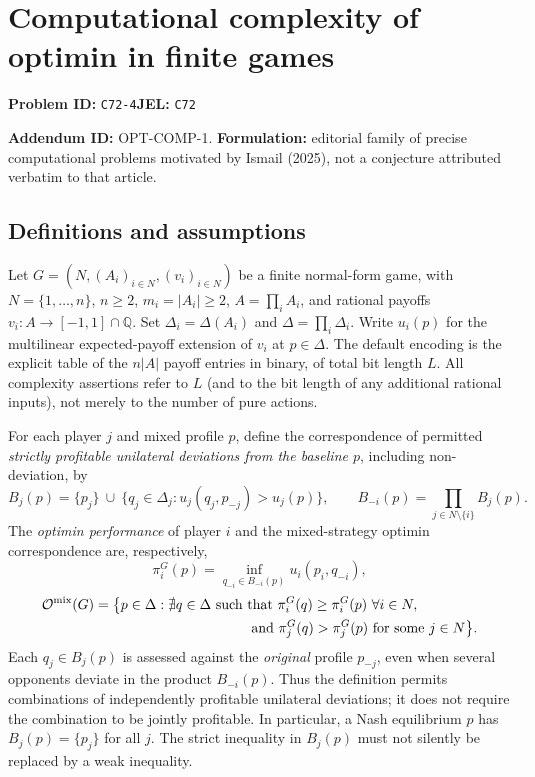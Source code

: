 \documentclass[11pt,a4paper]{article}
\begin{document}
\section*{Computational complexity of optimin in finite games}
\textbf{Problem ID:} \texttt{C72-4}\quad \textbf{JEL:} \texttt{C72}\par
\label{problem:OP-0589}
\noindent\textbf{Addendum ID:} OPT-COMP-1. \textbf{Formulation:} editorial family of precise computational problems motivated by Ismail (2025), not a conjecture attributed verbatim to that article.

\subsection*{Definitions and assumptions}

Let $G=(N,(A_i)_{i\in N},(v_i)_{i\in N})$ be a finite normal-form game, with $N=\{1,\ldots,n\}$, $n\ge2$, $m_i=|A_i|\ge2$, $A=\prod_i A_i$, and rational payoffs $v_i:A\to[-1,1]\cap\mathbb Q$. Set $\Delta_i=\Delta(A_i)$ and $\Delta=\prod_i\Delta_i$. Write $u_i(p)$ for the multilinear expected-payoff extension of $v_i$ at $p\in\Delta$. The default encoding is the explicit table of the $n|A|$ payoff entries in binary, of total bit length $L$. All complexity assertions refer to $L$ (and to the bit length of any additional rational inputs), not merely to the number of pure actions.

For each player $j$ and mixed profile $p$, define the correspondence of permitted \emph{strictly profitable unilateral deviations from the baseline $p$}, including non-deviation, by
\[
B_j(p)=\{p_j\}\ \cup\
\bigl\{q_j\in\Delta_j:
u_j(q_j,p_{-j})>u_j(p)\bigr\},
\qquad B_{-i}(p)=\prod_{j\in N\setminus\{i\}}B_j(p).
\]
The \emph{optimin performance} of player $i$ and the mixed-strategy optimin correspondence are, respectively,
\[
\pi_i^G(p)=\inf_{q_{-i}\in B_{-i}(p)}u_i(p_i,q_{-i}),
\]
\[
\begin{aligned}
\mathcal O^{\mathrm{mix}}(G)=\bigl\{p\in\Delta:\;&\nexists q\in\Delta\text{ such that }
\pi_i^G(q)\ge\pi_i^G(p)\ \forall i\in N,\\
&\hspace{21mm}\text{and }
\pi_j^G(q)>\pi_j^G(p)\text{ for some }j\in N\bigr\}.
\end{aligned}
\]
Each $q_j\in B_j(p)$ is assessed against the \emph{original} profile $p_{-j}$, even when several opponents deviate in the product $B_{-i}(p)$. Thus the definition permits combinations of independently profitable unilateral deviations; it does not require the combination to be jointly profitable. In particular, a Nash equilibrium $p$ has $B_j(p)=\{p_j\}$ for all $j$. The strict inequality in $B_j(p)$ must not silently be replaced by a weak inequality.
\end{document}
